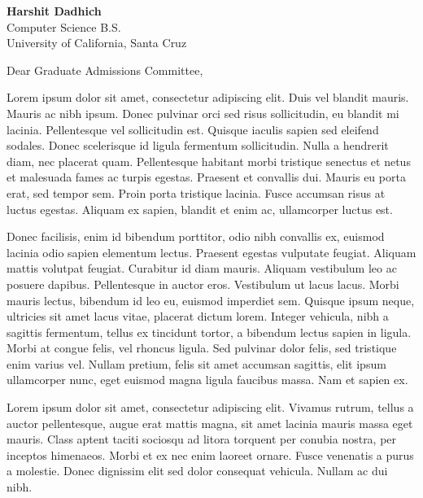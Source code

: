 \documentclass[11pt]{cicsletter}
\date{December 15, 2024\\Mountain House, CA 95391}
\begin{document}
\begin{letter}{
        {\textbf{Harshit Dadhich}}\hfill \href{https://harshdadhich.com}{\color[HTML]{0000EE}{https://harshdadhich.com}}~\faGlobe\\
        Computer Science B.S.\hfill \href{mailto:hdadhich01@gmail.com}{\color[HTML]{0000EE}{hdadhich01@gmail.com}}~\faEnvelope\\
        University of California, Santa Cruz\hfill \href{tel:+12096371007}{\color[HTML]{0000EE}{+1 (209) 637-1007}}~\faPhone\\
    }
    \opening{Dear Graduate Admissions Committee,}

    \vspace{1em}

    Lorem ipsum dolor sit amet, consectetur adipiscing elit. Duis vel blandit mauris. Mauris ac nibh ipsum. Donec pulvinar orci sed risus sollicitudin, eu blandit mi lacinia. Pellentesque vel sollicitudin est. Quisque iaculis sapien sed eleifend sodales. Donec scelerisque id ligula fermentum sollicitudin. Nulla a hendrerit diam, nec placerat quam. Pellentesque habitant morbi tristique senectus et netus et malesuada fames ac turpis egestas. Praesent et convallis dui. Mauris eu porta erat, sed tempor sem. Proin porta tristique lacinia. Fusce accumsan risus at luctus egestas. Aliquam ex sapien, blandit et enim ac, ullamcorper luctus est.

    Donec facilisis, enim id bibendum porttitor, odio nibh convallis ex, euismod lacinia odio sapien elementum lectus. Praesent egestas vulputate feugiat. Aliquam mattis volutpat feugiat. Curabitur id diam mauris. Aliquam vestibulum leo ac posuere dapibus. Pellentesque in auctor eros. Vestibulum ut lacus lacus. Morbi mauris lectus, bibendum id leo eu, euismod imperdiet sem. Quisque ipsum neque, ultricies sit amet lacus vitae, placerat dictum lorem. Integer vehicula, nibh a sagittis fermentum, tellus ex tincidunt tortor, a bibendum lectus sapien in ligula. Morbi at congue felis, vel rhoncus ligula. Sed pulvinar dolor felis, sed tristique enim varius vel. Nullam pretium, felis sit amet accumsan sagittis, elit ipsum ullamcorper nunc, eget euismod magna ligula faucibus massa. Nam et sapien ex.

    Lorem ipsum dolor sit amet, consectetur adipiscing elit. Vivamus rutrum, tellus a auctor pellentesque, augue erat mattis magna, sit amet lacinia mauris massa eget mauris. Class aptent taciti sociosqu ad litora torquent per conubia nostra, per inceptos himenaeos. Morbi et ex nec enim laoreet ornare. Fusce venenatis a purus a molestie. Donec dignissim elit sed dolor consequat vehicula. Nullam ac dui nibh.


\end{letter}
\end{document}
